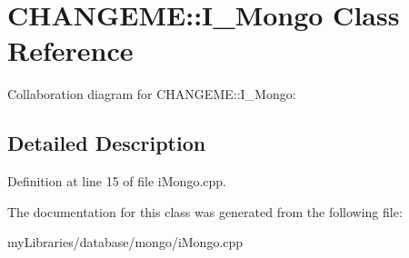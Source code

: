 \hypertarget{classCHANGEME_1_1I__Mongo}{}\section{C\+H\+A\+N\+G\+E\+ME\+::I\+\_\+\+Mongo Class Reference}
\label{classCHANGEME_1_1I__Mongo}


Collaboration diagram for C\+H\+A\+N\+G\+E\+ME\+::I\+\_\+\+Mongo\+:


\subsection{Detailed Description}


Definition at line 15 of file i\+Mongo.\+cpp.



The documentation for this class was generated from the following file\+:\begin{DoxyCompactItemize}
\item 
my\+Libraries/database/mongo/i\+Mongo.\+cpp\end{DoxyCompactItemize}

